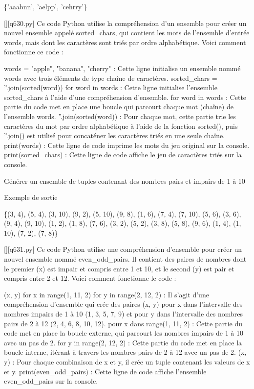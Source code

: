 \{'aaabnn', 'aelpp', 'cehrry'\}
        \par
        \begin{solution}
            \renewcommand{\nomfichier}{q630.py}
            \pythonfile{\chemincode \nomfichier}[][\nomfichier]
            Ce code Python utilise la compréhension d'un ensemble pour créer un nouvel ensemble appelé sorted_chars, qui contient les mots de l'ensemble d'entrée words, mais dont les caractères sont triés par ordre alphabétique. Voici comment fonctionne ce code :

    words = {"apple", "banana", "cherry"} : Cette ligne initialise un ensemble nommé words avec trois éléments de type chaîne de caractères.
    sorted_chars = {''.join(sorted(word)) for word in words} : Cette ligne initialise l'ensemble sorted_chars à l'aide d'une compréhension d'ensemble.
        for word in words : Cette partie du code met en place une boucle qui parcourt chaque mot (chaîne) de l'ensemble words.
        {''.join(sorted(word))} : Pour chaque mot, cette partie trie les caractères du mot par ordre alphabétique à l'aide de la fonction sorted(), puis ''.join() est utilisé pour concaténer les caractères triés en une seule chaîne.
    print(words) : Cette ligne de code imprime les mots du jeu original sur la console.
    print(sorted_chars) : Cette ligne de code affiche le jeu de caractères triés sur la console.
        \end{solution}
        

        \question
        Générer un ensemble de tuples contenant des nombres pairs et impairs de 1 à 10

Exemple de sortie

\{(3, 4), (5, 4), (3, 10), (9, 2), (5, 10), (9, 8), (1, 6), (7, 4), (7, 10), (5, 6), (3, 6), (9, 4), (9, 10), (1, 2), (1, 8), (7, 6), (3, 2), (5, 2), (3, 8), (5, 8), (9, 6), (1, 4), (1, 10), (7, 2), (7, 8)\}
        \par
        \begin{solution}
            \renewcommand{\nomfichier}{q631.py}
            \pythonfile{\chemincode \nomfichier}[][\nomfichier]
            Ce code Python utilise une compréhension d'ensemble pour créer un nouvel ensemble nommé even_odd_pairs. Il contient des paires de nombres dont le premier (x) est impair et compris entre 1 et 10, et le second (y) est pair et compris entre 2 et 12. Voici comment fonctionne le code :

    {(x, y) for x in range(1, 11, 2) for y in range(2, 12, 2)} : Il s'agit d'une compréhension d'ensemble qui crée des paires (x, y) pour x dans l'intervalle des nombres impairs de 1 à 10 (1, 3, 5, 7, 9) et pour y dans l'intervalle des nombres pairs de 2 à 12 (2, 4, 6, 8, 10, 12).
        pour x dans range(1, 11, 2) : Cette partie du code met en place la boucle externe, qui parcourt les nombres impairs de 1 à 10 avec un pas de 2.
        for y in range(2, 12, 2) : Cette partie du code met en place la boucle interne, itérant à travers les nombres pairs de 2 à 12 avec un pas de 2.
        (x, y) : Pour chaque combinaison de x et y, il crée un tuple contenant les valeurs de x et y.
    print(even_odd_pairs) : Cette ligne de code affiche l'ensemble even_odd_pairs sur la console.
        \end{solution}
        

